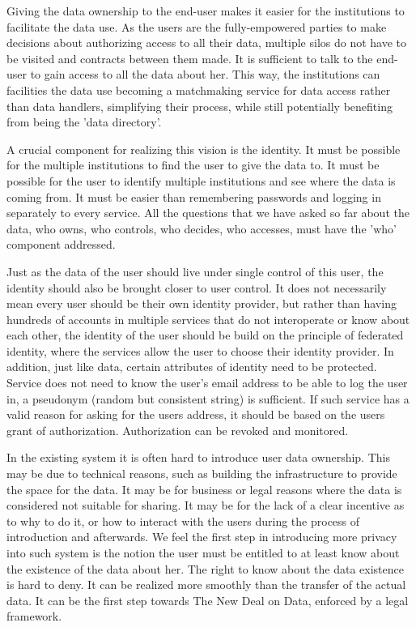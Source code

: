 Giving the data ownership to the end-user makes it easier for the institutions to facilitate the data use.
As the users are the fully-empowered parties to make decisions about authorizing access to all their data, multiple silos do not have to be visited and contracts between them made.
It is sufficient to talk to the end-user to gain access to all the data about her.
This way, the institutions can facilities the data use becoming a matchmaking service for data access rather than data handlers, simplifying their process, while still potentially benefiting from being the 'data directory'.

A crucial component for realizing this vision is the identity.
It must be possible for the multiple institutions to find the user to give the data to.
It must be possible for the user to identify multiple institutions and see where the data is coming from.
It must be easier than remembering passwords and logging in separately to every service.
All the questions that we have asked so far about the data, who owns, who controls, who decides, who accesses, must have the 'who' component addressed.

Just as the data of the user should live under single control of this user, the identity should also be brought closer to user control.
It does not necessarily mean every user should be their own identity provider, but rather than having hundreds of accounts in multiple services that do not interoperate or know about each other, the identity of the user should be build on the principle of federated identity, where the services allow the user to choose their identity provider.
In addition, just like data, certain attributes of identity need to be protected.
Service does not need to know the user's email address to be able to log the user in, a pseudonym (random but consistent string) is sufficient.
If such service has a valid reason for asking for the users address, it should be based on the users grant of authorization.
Authorization can be revoked and monitored.

In the existing system it is often hard to introduce user data ownership.
This may be due to technical reasons, such as building the infrastructure to provide the space for the data.
It may be for business or legal reasons where the data is considered not suitable for sharing.
It may be for the lack of a clear incentive as to why to do it, or how to interact with the users during the process of introduction and afterwards.
We feel the first step in introducing more privacy into such system is the notion the user must be entitled to at least know about the existence of the data about her.
The right to know about the data existence is hard to deny. It can be realized more smoothly than the transfer of the actual data.
It can be the first step towards The New Deal on Data, enforced by a legal framework.
